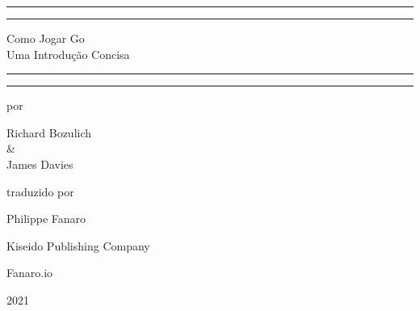 \begin{titlepage}
    \centering
    
    \scshape
    
    \vspace*{\baselineskip}
    
    
    \rule{\textwidth}{1.6pt}\vspace*{-\baselineskip}\vspace*{2pt}
    \rule{\textwidth}{0.4pt}
    
    \vspace{0.7\baselineskip}
    
    \Huge{Como Jogar Go}\\
    \vspace*{10pt}
    \LARGE{Uma Introdução Concisa}
    
    \vspace{0.275\baselineskip}
    
    \rule{\textwidth}{0.4pt}\vspace*{-\baselineskip}\vspace{3.2pt}
    \rule{\textwidth}{1.6pt}
    
    
    \vspace*{2cm}

    \large{por}

    \vspace*{0.125cm}
    
    \Large{Richard Bozulich}\\
    \normalsize{\&}\\
    \Large{James Davies}
    
    \vspace*{1.5cm}

    \large{traduzido por}

    \vspace*{0.125cm}

    \Large{Philippe Fanaro}
    
    \vfill
    
    
    \large{Kiseido Publishing Company}

    \vspace*{0.25cm}
    
    \large{Fanaro.io}

    \vspace{1.5cm}

    \large{2021}
\end{titlepage}